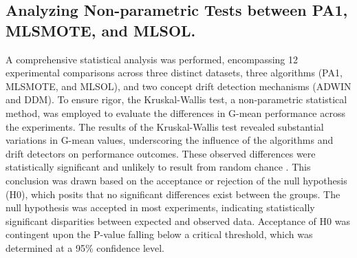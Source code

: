 \subsection{Analyzing Non-parametric Tests between PA1, MLSMOTE, and MLSOL.}
A comprehensive statistical analysis was performed, encompassing 12 experimental comparisons across three distinct datasets, three algorithms (PA1, MLSMOTE, and MLSOL), and two concept drift detection mechanisms (ADWIN and DDM). To ensure rigor, the Kruskal-Wallis test, a non-parametric statistical method, was employed to evaluate the differences in G-mean performance across the experiments. The results of the Kruskal-Wallis test revealed substantial variations in G-mean values, underscoring the influence of the algorithms and drift detectors on performance outcomes. These observed differences were statistically significant and unlikely to result from random chance \cite{yamada2013change}. This conclusion was drawn based on the acceptance or rejection of the null hypothesis (H0), which posits that no significant differences exist between the groups. The null hypothesis was accepted in most experiments, indicating statistically significant disparities between expected and observed data. Acceptance of H0 was contingent upon the P-value falling below a critical threshold, which was determined at a 95\% confidence level.
